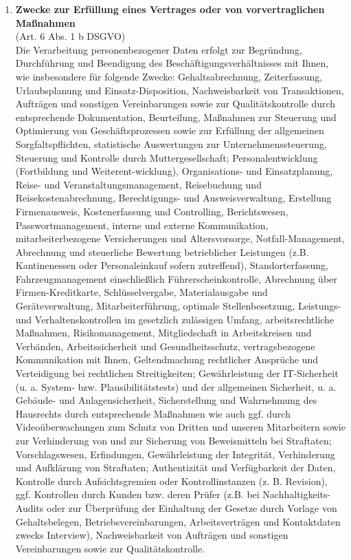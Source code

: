 \documentclass[a4paper, fontsize=11pt]{scrartcl}
\begin{document}
\begin{enumerate}[label=\textbf{\arabic*.},ref=\arabic*]
  \begin{enumerate}[label=\textbf{\ref{zwecke}.\arabic*},ref=\ref{zwecke}.\arabic*]
    \item \label{zwecke1} \textbf{Zwecke zur Erfüllung eines Vertrages oder von vorvertraglichen Maßnahmen} \\ (Art. 6 Abs. 1 b DSGVO) \\ Die Verarbeitung personenbezogener Daten erfolgt zur Begründung, Durchführung und Beendigung des Beschäftigungsverhältnisses mit Ihnen, wie insbesondere für folgende Zwecke: Gehaltsabrechnung, Zeiterfassung, Urlaubsplanung und Einsatz-Disposition, Nachweisbarkeit von Transaktionen, Aufträgen und sonstigen Vereinbarungen sowie zur Qualitätskontrolle durch entsprechende Dokumentation, Beurteilung, Maßnahmen zur Steuerung und Optimierung von Geschäftsprozessen sowie zur Erfüllung der allgemeinen Sorgfaltspflichten, statistische Auswertungen zur Unternehmenssteuerung, Steuerung und Kontrolle durch Muttergesellschaft; Personalentwicklung (Fortbildung und Weiterent-wicklung), Organisations- und Einsatzplanung, Reise- und Veranstaltungsmanagement, Reisebuchung und Reisekostenabrechnung, Berechtigungs- und Ausweisverwaltung, Erstellung Firmenausweis, Kostenerfassung und Controlling, Berichtswesen, Passwortmanagement, interne und externe Kommunikation, mitarbeiterbezogene Versicherungen und Altersvorsorge, Notfall-Management, Abrechnung und steuerliche Bewertung betrieblicher Leistungen (z.B. Kantinenessen oder Personaleinkauf sofern zutreffend), Standorterfassung, Fahrzeugmanagement einschließlich Führerscheinkontrolle, Abrechnung über Firmen-Kreditkarte, Schlüsselvergabe, Materialausgabe und Geräteverwaltung, Mitarbeiterführung, optimale Stellenbesetzung, Leistungs- und Verhaltenskontrollen im gesetzlich zulässigen Umfang, arbeitsrechtliche Maßnahmen, Risikomanagement, Mitgliedschaft in Arbeitskreisen und Verbänden, Arbeitssicherheit und Gesundheitsschutz, vertragsbezogene Kommunikation mit Ihnen, Geltendmachung rechtlicher Ansprüche und Verteidigung bei rechtlichen Streitigkeiten; Gewährleistung der IT-Sicherheit (u. a. System- bzw. Plausibilitätstests) und der allgemeinen Sicherheit, u. a. Gebäude- und Anlagensicherheit, Sicherstellung und Wahrnehmung des Hausrechts durch entsprechende Maßnahmen wie auch ggf. durch Videoüberwachungen zum Schutz von Dritten und unseren Mitarbeitern sowie zur Verhinderung von und zur Sicherung von Beweismitteln bei Straftaten; Vorschlagswesen, Erfindungen, Gewährleistung der Integrität, Verhinderung und Aufklärung von Straftaten; Authentizität und Verfügbarkeit der Daten, Kontrolle durch Aufsichtsgremien oder Kontrollinstanzen (z. B. Revision), ggf. Kontrollen durch Kunden bzw. deren Prüfer (z.B. bei Nachhaltigkeits-Audits oder zur Überprüfung der Einhaltung der Gesetze durch Vorlage von Gehaltsbelegen, Betriebsvereinbarungen, Arbeitsverträgen und Kontaktdaten zwecks Interview), Nachweisbarkeit von Aufträgen und sonstigen Vereinbarungen sowie zur Qualitätskontrolle.

\end{enumerate}
\end{enumerate}
\end{document}
